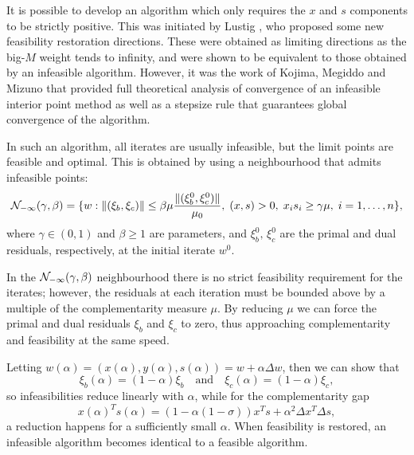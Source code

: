 It is possible to develop an algorithm which only requires 
the $x$ and $s$ components to be strictly positive. 
This was initiated by Lustig \cite{Lustig91}, who proposed some
new feasibility restoration directions.
These were obtained as limiting directions as the big-$M$
weight tends to infinity, and were shown to be equivalent
to those obtained by an infeasible algorithm.
However, it was the work of Kojima, Megiddo and Mizuno 
\cite{KojimaMegiddoMizuno}
that provided full theoretical analysis of convergence of
an infeasible interior point method as well as
a stepsize rule that guarantees global convergence of the algorithm.

In such 
an algorithm, all iterates are usually infeasible, but the limit points 
are feasible and optimal. This is obtained by using a 
neighbourhood that admits infeasible points:
\[
\mathcal{N}_{-\infty}(\gamma,\beta) =\{ w :
           \|(\xi_b,\xi_c)\| \le \beta\mu \frac{\|(\xi_b^0,\xi_c^0)\|}{\mu_0}, 
	   \; (x,s)>0, \; x_is_i \ge \gamma\mu, \; i = 1, \ldots, n \},
\]
where $\gamma\in (0,1)$ and $\beta \ge 1$ are parameters, and 
$\xi_b^0,\,\xi_c^0$ are the primal and dual residuals, respectively, 
at the initial iterate $w^0$.

In the $\mathcal{N}_{-\infty}(\gamma,\beta)$ neighbourhood
there is no strict feasibility requirement for 
the iterates; however, the residuals at each iteration must be 
bounded above by a multiple of the complementarity measure $\mu$. 
By reducing $\mu$ we can force the primal and dual residuals 
$\xi_b$ and $\xi_c$ to zero, thus approaching complementarity and 
feasibility at the same speed.


Letting 
$w(\alpha) = (x(\alpha),y(\alpha),s(\alpha)) = w + \alpha\Delta w$,
then we can show that
\[
  \xi_b(\alpha) = (1-\alpha) \xi_b \quad \text{and} \quad 
  \xi_c(\alpha) = (1-\alpha) \xi_c,
\]
so infeasibilities reduce linearly with $\alpha$, while for the 
complementarity gap
\[
  x(\alpha)^Ts(\alpha)=(1-\alpha(1 -\sigma))x^Ts +\alpha^2 \Delta x^T \Delta s,
\]
a reduction happens for a sufficiently small $\alpha$. 
When feasibility is restored, an infeasible algorithm becomes identical
to a feasible algorithm. 

